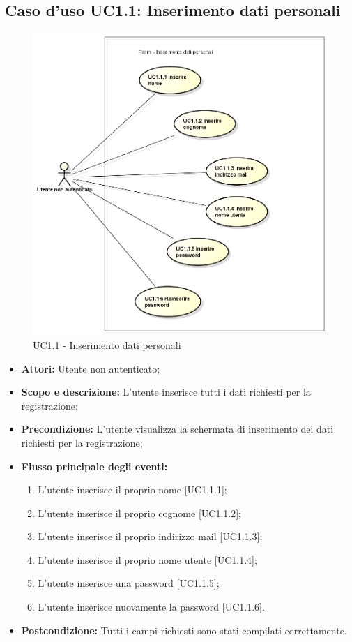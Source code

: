 \subsection{Caso d'uso UC1.1: Inserimento dati personali}
\begin{figure}[h] 
	\centering 
	\includegraphics[scale=0.45] {img/UC1.1.png} 
	\caption{UC1.1 - Inserimento dati personali} 
\end{figure}
\begin{itemize}
	\item \textbf{Attori:} Utente non autenticato;
	\item \textbf{Scopo e descrizione:} L'utente inserisce tutti i dati richiesti per la registrazione;
	\item \textbf{Precondizione:} L'utente visualizza la schermata di inserimento dei dati richiesti per la registrazione;
	\item \textbf{Flusso principale degli eventi:}
	\begin{enumerate}
		\item L'utente inserisce il proprio nome [UC1.1.1];
		\item L'utente inserisce il proprio cognome [UC1.1.2];
		\item L'utente inserisce il proprio indirizzo mail [UC1.1.3];
		\item L'utente inserisce il proprio nome utente [UC1.1.4];
		\item L'utente inserisce una password [UC1.1.5];
		\item L'utente inserisce nuovamente la password [UC1.1.6].
	\end{enumerate}
	\item \textbf{Postcondizione:} Tutti i campi richiesti sono stati compilati correttamente.
\end{itemize}

